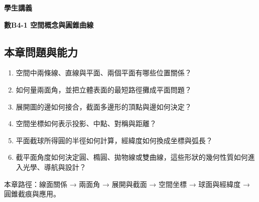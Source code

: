 \documentclass[11pt,a4paper]{article}
\providecommand{\tightlist}{%
  \setlength{\itemsep}{0pt}\setlength{\parskip}{0pt}}
\begin{document}
\begin{tcolorbox}[
  enhanced,colback=white,colframe=HandoutBlue,boxrule=1.1pt,arc=2mm,
  borderline west={3pt}{0pt}{HandoutBlue},left=5mm,right=4mm,top=4mm,bottom=4mm
]
{\sffamily\small\bfseries\color{HandoutBlue}學生講義}\par
{\sffamily\bfseries\LARGE\color{HandoutInk}數B4-1 空間概念與圓錐曲線}\par
\vspace{0.35em}{\large 從線面關係、展開與截面建立空間模型，再以坐標、球面與圓錐截痕處理位置、距離及形狀}\par
{}\par
{}\par
\end{tcolorbox}


\begin{HandoutLearningMap}

\subsection{本章問題與能力}\label{ux672cux7ae0ux554fux984cux8207ux80fdux529b}

\begin{enumerate}
\def\labelenumi{\arabic{enumi}.}
\tightlist
\item
  空間中兩條線、直線與平面、兩個平面有哪些位置關係？
\item
  如何量兩面角，並把立體表面的最短路徑攤成平面問題？
\item
  展開圖的邊如何接合，截面多邊形的頂點與邊如何決定？
\item
  空間坐標如何表示投影、中點、對稱與距離？
\item
  平面截球所得圓的半徑如何計算，經緯度如何換成坐標與弧長？
\item
  截平面角度如何決定圓、橢圓、拋物線或雙曲線，這些形狀的幾何性質如何進入光學、導航與設計？
\end{enumerate}

本章路徑：線面關係 → 兩面角 → 展開與截面 → 空間坐標 → 球面與經緯度 → 圓錐截痕與應用。

\end{HandoutLearningMap}
\end{document}
